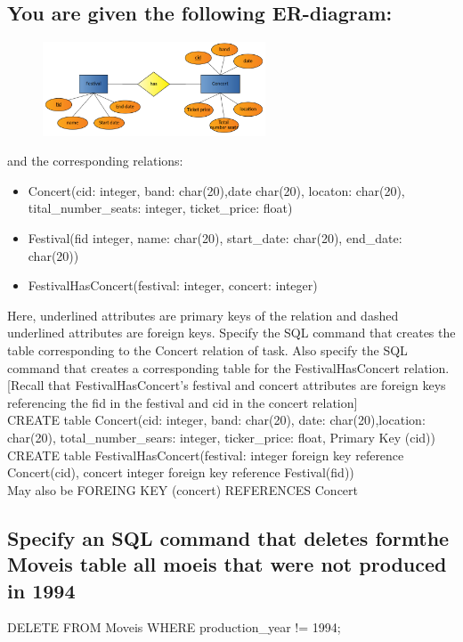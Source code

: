 \documentclass[12pt, a4paper]{article}
\begin{document}
		\subsection{You are given the following ER-diagram:}
			\begin{figure}[h!]
				\centering
				\includegraphics[width=250px]{images/47,6.png}
				\label{}
				\caption{}
			\end{figure}
			and the corresponding relations:\\
			\begin{itemize}
				\item Concert(cid: integer, band: char(20),date char(20), locaton: char(20), tital\_number\_seats: integer, ticket\_price: float)
				\item Festival(fid integer, name: char(20), start\_date: char(20), end\_date: char(20))
				\item FestivalHasConcert(festival: integer, concert: integer)
			\end{itemize}
			Here, underlined attributes are primary keys of the relation and dashed
			underlined attributes are foreign keys.
			Specify the SQL command that creates the table corresponding to the
			Concert relation of task.
			Also specify the SQL command that creates a corresponding table for
			the FestivalHasConcert relation.
			[Recall that FestivalHasConcert’s festival and concert attributes are
			foreign keys referencing the fid in the festival and cid in the concert relation]	\\[4mm]
			CREATE table Concert(cid: integer, band: char(20), date: char(20),location: char(20), total\_number\_sears: integer, ticker\_price: float, Primary Key (cid))\\
			CREATE table FestivalHasConcert(festival: integer foreign key reference Concert(cid), concert integer foreign key reference Festival(fid))\\
			May also be FOREING KEY (concert) REFERENCES Concert
		\subsection{Specify an SQL command that deletes formthe Moveis table all moeis that were not produced in 1994}
			DELETE FROM Moveis WHERE production\_year != 1994;
\end{document}
